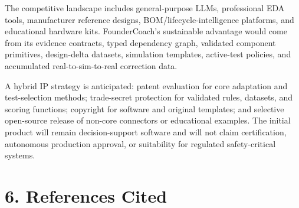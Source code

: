 \documentclass[12pt,letterpaper]{article}
\begin{document}
The competitive landscape includes general-purpose LLMs, professional EDA tools, manufacturer reference designs, BOM/lifecycle-intelligence platforms, and educational hardware kits. FounderCoach's sustainable advantage would come from its evidence contracts, typed dependency graph, validated component primitives, design-delta datasets, simulation templates, active-test policies, and accumulated real-to-sim-to-real correction data.

A hybrid IP strategy is anticipated: patent evaluation for core adaptation and test-selection methods; trade-secret protection for validated rules, datasets, and scoring functions; copyright for software and original templates; and selective open-source release of non-core connectors or educational examples. The initial product will remain decision-support software and will not claim certification, autonomous production approval, or suitability for regulated safety-critical systems.


\newpage
\section{6. References Cited}
\printbibliography[heading=none]
\end{document}
